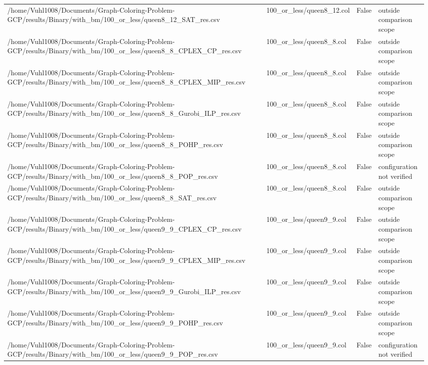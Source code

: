 \begin{table}[htbp]
\begin{tabular}{llll}
/home/Vuhl1008/Documents/Graph-Coloring-Problem-GCP/results/Binary/with\_bm/100\_or\_less/queen8\_12\_SAT\_res.csv & 100\_or\_less/queen8\_12.col & False & outside comparison scope \\
/home/Vuhl1008/Documents/Graph-Coloring-Problem-GCP/results/Binary/with\_bm/100\_or\_less/queen8\_8\_CPLEX\_CP\_res.csv & 100\_or\_less/queen8\_8.col & False & outside comparison scope \\
/home/Vuhl1008/Documents/Graph-Coloring-Problem-GCP/results/Binary/with\_bm/100\_or\_less/queen8\_8\_CPLEX\_MIP\_res.csv & 100\_or\_less/queen8\_8.col & False & outside comparison scope \\
/home/Vuhl1008/Documents/Graph-Coloring-Problem-GCP/results/Binary/with\_bm/100\_or\_less/queen8\_8\_Gurobi\_ILP\_res.csv & 100\_or\_less/queen8\_8.col & False & outside comparison scope \\
/home/Vuhl1008/Documents/Graph-Coloring-Problem-GCP/results/Binary/with\_bm/100\_or\_less/queen8\_8\_POHP\_res.csv & 100\_or\_less/queen8\_8.col & False & outside comparison scope \\
/home/Vuhl1008/Documents/Graph-Coloring-Problem-GCP/results/Binary/with\_bm/100\_or\_less/queen8\_8\_POP\_res.csv & 100\_or\_less/queen8\_8.col & False & configuration not verified \\
/home/Vuhl1008/Documents/Graph-Coloring-Problem-GCP/results/Binary/with\_bm/100\_or\_less/queen8\_8\_SAT\_res.csv & 100\_or\_less/queen8\_8.col & False & outside comparison scope \\
/home/Vuhl1008/Documents/Graph-Coloring-Problem-GCP/results/Binary/with\_bm/100\_or\_less/queen9\_9\_CPLEX\_CP\_res.csv & 100\_or\_less/queen9\_9.col & False & outside comparison scope \\
/home/Vuhl1008/Documents/Graph-Coloring-Problem-GCP/results/Binary/with\_bm/100\_or\_less/queen9\_9\_CPLEX\_MIP\_res.csv & 100\_or\_less/queen9\_9.col & False & outside comparison scope \\
/home/Vuhl1008/Documents/Graph-Coloring-Problem-GCP/results/Binary/with\_bm/100\_or\_less/queen9\_9\_Gurobi\_ILP\_res.csv & 100\_or\_less/queen9\_9.col & False & outside comparison scope \\
/home/Vuhl1008/Documents/Graph-Coloring-Problem-GCP/results/Binary/with\_bm/100\_or\_less/queen9\_9\_POHP\_res.csv & 100\_or\_less/queen9\_9.col & False & outside comparison scope \\
/home/Vuhl1008/Documents/Graph-Coloring-Problem-GCP/results/Binary/with\_bm/100\_or\_less/queen9\_9\_POP\_res.csv & 100\_or\_less/queen9\_9.col & False & configuration not verified \\

\end{tabular}
\end{table}
